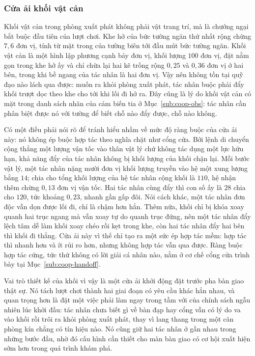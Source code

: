\subsubsection{Cửa ải khối vật cản}
\label{sub:coop-block}
\indent Khối vật cản trong phòng xuất phát không phải vật trang trí, mà là chướng ngại bắt
buộc đầu tiên của lượt chơi. Khe hở của bức tường ngăn thứ nhất rộng chừng $7{,}6$ đơn vị,
tính từ mặt trong của tường biên tới đầu mút bức tường ngăn. Khối vật cản là một
hình lập phương cạnh bảy đơn vị, khối lượng $100$ đơn vị, đặt nằm gọn trong khe hở ấy
và chỉ chừa lại hai kẽ trống rộng $0{,}25$ và $0{,}36$ đơn vị ở hai bên, trong khi bề
ngang của tác nhân là hai đơn vị. Vậy nên không tồn tại quỹ đạo nào lách qua được: muốn ra
khỏi phòng xuất phát, tác nhân buộc phải đẩy khối trượt dọc theo khe cho tới khi lối đi hở
ra. Đây cũng là lý do khối vật cản có mặt trong danh sách nhãn của cảm biến tia ở
Mục~\ref{sub:coop-obs}: tác nhân cần phân biệt được nó với tường để biết chỗ nào đẩy
được, chỗ nào không.

\indent Có một điều phải nói rõ để tránh hiểu nhầm về mức độ ràng buộc của cửa ải này: nó
không ép buộc hợp tác theo nghĩa chặt như cổng cửa. Bởi lệnh di chuyển cộng thẳng một
lượng vận tốc vào thân vật lý chứ không tác dụng một lực hữu hạn, khả năng đẩy của tác
nhân không bị khối lượng của khối chặn lại. Mỗi bước vật lý, một tác nhân nặng mười đơn vị
khối lượng truyền vào hệ một xung lượng bằng $14$; chia cho tổng khối lượng của hệ tác nhân
cộng khối là $110$, hệ nhận thêm chừng $0{,}13$ đơn vị vận tốc. Hai tác nhân
cùng đẩy thì con số ấy là $28$ chia cho $120$, tức khoảng $0{,}23$, nhanh gần gấp đôi. Nói
cách khác, một tác nhân đơn độc vẫn dọn được lối đi, chỉ là chậm
hơn hẳn. Thêm nữa, khối chỉ bị khóa xoay quanh hai trục ngang mà vẫn xoay tự do quanh trục
đứng, nên một tác nhân đẩy lệch tâm dễ làm khối xoay chéo rồi kẹt trong khe, còn hai tác
nhân đẩy hai bên thì khối đi thẳng. Cửa ải này vì thế chỉ tạo ra một sức ép hợp tác mềm:
hợp tác thì nhanh hơn và ít rủi ro hơn, nhưng không hợp tác vẫn qua được. Ràng buộc hợp
tác cứng, tức thứ không có lời giải cá nhân nào, nằm ở cơ chế cổng cửa trình bày tại
Mục~\ref{sub:coop-handoff}.

\indent Vai trò thiết kế của khối vì vậy là một cửa ải khởi động đặt trước pha bàn giao
thật sự. Nó tách lượt chơi thành hai giai đoạn có yêu cầu khác hẳn nhau, và quan trọng hơn
là đặt một việc phải làm ngay trong tầm với của chính sách ngẫu nhiên lúc khởi đầu: tác
nhân chưa biết gì về bàn đạp hay cổng vẫn có lý do va vào khối rồi trôi ra khỏi phòng xuất
phát, thay vì lang thang trong một căn phòng kín chẳng có tín hiệu nào. Nó cũng giữ hai
tác nhân ở gần nhau trong những bước đầu, nhờ đó cấu hình cần thiết cho màn bàn giao có cơ
hội xuất hiện sớm hơn trong quá trình khám phá.

